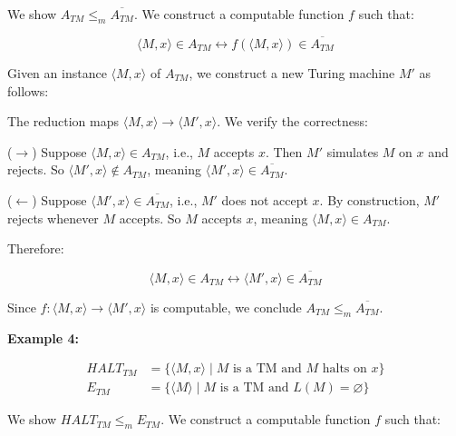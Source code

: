 \documentclass[12pt,a4paper,openany]{article}
\begin{document}
We show $A_{TM} \leq_m \overline{A_{TM}}$. We construct a computable function $f$ such that:

\[
\langle M, x\rangle \in A_{TM} \leftrightarrow f(\langle M, x\rangle) \in \overline{A_{TM}}
\]

\noindent Given an instance $\langle M, x\rangle$ of $A_{TM}$, we construct a new Turing machine $M'$ as follows:

\bigskip

\begin{center}
\end{center}

The reduction maps $\langle M, x\rangle \to \langle M', x \rangle$. We verify the correctness:

($\to$) Suppose $\langle M, x\rangle \in A_{TM}$, i.e., $M$ accepts $x$. Then $M'$ simulates $M$ on $x$ and rejects. So $\langle M', x \rangle \notin A_{TM}$, meaning $\langle M', x \rangle \in \overline{A_{TM}}$.

($\leftarrow$) Suppose $\langle M', x \rangle \in \overline{A_{TM}}$, i.e., $M'$ does not accept $x$. By construction, $M'$ rejects whenever $M$ accepts. So $M$ accepts $x$, meaning $\langle M, x\rangle \in A_{TM}$.

Therefore:

\[
\langle M, x\rangle \in A_{TM} \leftrightarrow \langle M', x \rangle \in \overline{A_{TM}}
\]

Since $f : \langle M, x\rangle \to \langle M', x \rangle$ is computable, we conclude $A_{TM} \leq_m \overline{A_{TM}}$.

\bigskip

\textbf{Example 4:}

\begin{align*}
HALT_{TM} &= \{\langle M, x \rangle \mid M \text{ is a TM and } M \text{ halts on } x\} \\
E_{TM} &= \{\langle M \rangle \mid M \text{ is a TM and } L(M) = \varnothing\}
\end{align*}

We show $HALT_{TM} \leq_m E_{TM}$. We construct a computable function $f$ such that:
\end{document}
